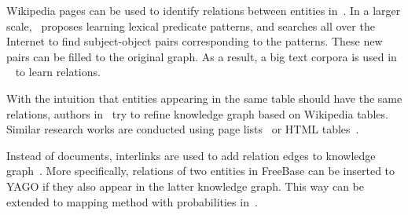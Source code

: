 Wikipedia pages can be used to identify relations between entities in~\cite{ref18}. In a larger scale,~\cite{ref19} proposes learning lexical predicate patterns, and searches all over the Internet to find subject-object pairs corresponding to the patterns. These new pairs can be filled to the original graph. As a result, a big text corpora is used in ~\cite{ref19} to learn relations.

With the intuition that entities appearing in the same table should have the same relations, authors in~\cite{ref20} try to refine knowledge graph based on Wikipedia tables. Similar research works are conducted using page lists~\cite{ref21} or HTML tables~\cite{ref22}.

Instead of documents, interlinks are used to add relation edges to knowledge graph~\cite{ref23, ref24}. More specifically, relations of two entities in FreeBase can be inserted to YAGO if they also appear in the latter knowledge graph. This way can be extended to mapping method with probabilities in~\cite{ref25}.